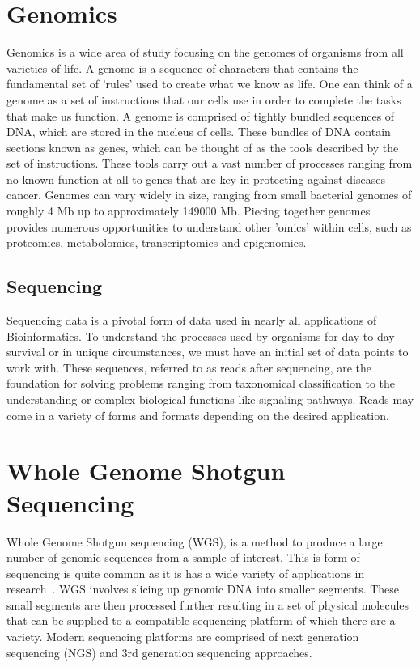 \section{Genomics}
Genomics is a wide area of study focusing on the genomes of organisms
from all varieties of life. A genome is a sequence of characters that
contains the fundamental set of 'rules' used to create what we know as
life. One can think of a genome as a set of instructions that our
cells use in order to complete the tasks that make us function. A
genome is comprised of tightly bundled sequences of DNA, which are
stored in the nucleus of cells. These bundles of DNA contain sections
known as genes, which can be thought of as the tools described by the
set of instructions. These tools carry out a vast number of processes
ranging from no known function at all to genes that are key in
protecting against diseases cancer. Genomes can vary widely in size,
ranging from small bacterial genomes of roughly 4 Mb up to
approximately 149000 Mb. Piecing together genomes provides numerous
opportunities to understand other 'omics' within cells, such as
proteomics, metabolomics, transcriptomics and epigenomics.

\subsection{Sequencing}
Sequencing data is a pivotal form of data used in nearly all
applications of Bioinformatics. To understand the processes used by
organisms for day to day survival or in unique circumstances, we must
have an initial set of data points to work with. These sequences,
referred to as reads after sequencing, are the foundation for solving
problems ranging from taxonomical classification to the understanding
or complex biological functions like signaling pathways. Reads may
come in a variety of forms and formats depending on the desired
application.

\section{Whole Genome Shotgun Sequencing}
Whole Genome Shotgun sequencing (WGS), is a method to produce a large
number of genomic sequences from a sample of interest. This is form of
sequencing is quite common as it is has a wide variety of applications
in research~\cite{Adams2008}. WGS involves slicing up genomic DNA into
smaller segments. These small segments are then processed further
resulting in a set of physical molecules that can be supplied to a
compatible sequencing platform of which there are a variety. Modern
sequencing platforms are comprised of next generation sequencing (NGS)
and 3rd generation sequencing approaches.

